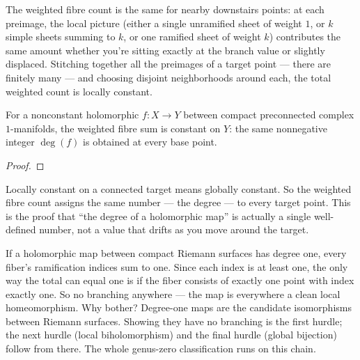 \begin{layman}
The weighted fibre count is the same for nearby downstairs points: at
each preimage, the local picture (either a single unramified sheet of
weight \(1\), or \(k\) simple sheets summing to \(k\), or one
ramified sheet of weight \(k\)) contributes the same amount whether
you're sitting exactly at the branch value or slightly displaced.
Stitching together all the preimages of a target point --- there are
finitely many --- and choosing disjoint neighborhoods around each, the
total weighted count is locally constant.
\end{layman}

\begin{theorem}
\label{thm:branched-degree-well-defined}
For a nonconstant holomorphic \(f:X\to Y\) between compact preconnected
complex \(1\)-manifolds, the weighted fibre sum is constant on \(Y\):
the same nonnegative integer \(\deg(f)\) is obtained at every base
point.
\leanok
\end{theorem}
\begin{proof}\leanok\end{proof}

\begin{layman}
Locally constant on a connected target means globally constant. So the
weighted fibre count assigns the same number --- the degree --- to every
target point. This is the proof that ``the degree of a holomorphic map''
is actually a single well-defined number, not a value that drifts as
you move around the target.
\end{layman}



\begin{layman}
If a holomorphic map between compact Riemann surfaces has degree one,
every fiber's ramification indices sum to one. Since each index is at
least one, the only way the total can equal one is if the fiber consists
of exactly one point with index exactly one. So no branching anywhere ---
the map is everywhere a clean local homeomorphism. Why bother?
Degree-one maps are the candidate isomorphisms between Riemann surfaces.
Showing they have no branching is the first hurdle; the next hurdle
(local biholomorphism) and the final hurdle (global bijection) follow
from there. The whole genus-zero classification runs on this chain.
\end{layman}

